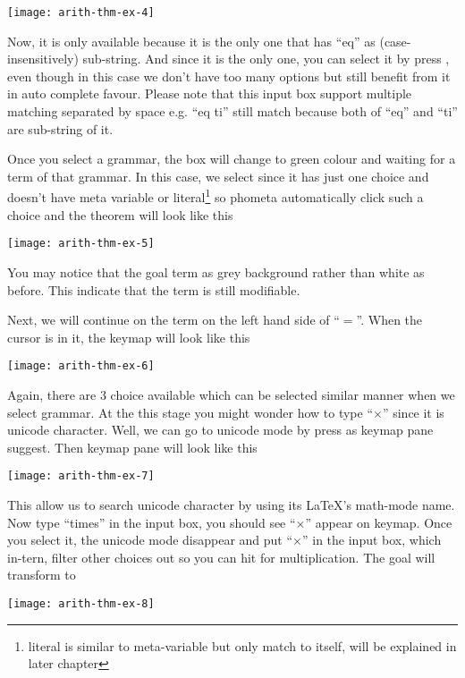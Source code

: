 \documentclass[master.tex]{subfiles}
\begin{document}
\begin{center}
\texttt{[image: arith-thm-ex-4]}
\end{center}

Now, it is only  available because it is the only one that has
``eq'' as (case-insensitively) sub-string. And since it is the only one, you can
select it by press , even though in this case we don't have too
many options but still benefit from it in auto complete favour. Please note that
this input box support multiple matching separated by space e.g. ``eq ti'' still
match  because both of ``eq'' and ``ti'' are sub-string of it.

Once you select a grammar, the box will change to green colour and waiting for a
term of that grammar. In this case, we select  since it has just
one choice and doesn't have meta variable or literal\footnote{literal is similar
  to meta-variable but only match to itself, will be explained in later
  chapter} so phometa automatically click such a choice and the theorem will
look like this

\begin{center}
\texttt{[image: arith-thm-ex-5]}
\end{center}

You may notice that the goal term as grey background rather than white as
before. This indicate that the term is still modifiable.

Next, we will continue on the  term on the left hand side of
``$=$''. When the cursor is in it, the keymap will look like this

\begin{center}
\texttt{[image: arith-thm-ex-6]}
\end{center}

Again, there are 3 choice available which can be selected similar manner when we
select grammar. At the this stage you might wonder how to type ``$\times$''
since it is unicode character. Well, we can go to unicode mode by press
 as keymap pane suggest. Then keymap pane will look like this

\begin{center}
\texttt{[image: arith-thm-ex-7]}
\end{center}

This allow us to search unicode character by using its \LaTeX{}'s math-mode
name. Now type ``times'' in the input box, you should see ``$\times$'' appear on
keymap. Once you select it, the unicode mode disappear and put ``$\times$'' in
the input box, which in-tern, filter other choices out so you can hit
 for multiplication. The goal will transform to
\begin{center}
\texttt{[image: arith-thm-ex-8]}
\end{center}
\end{document}
